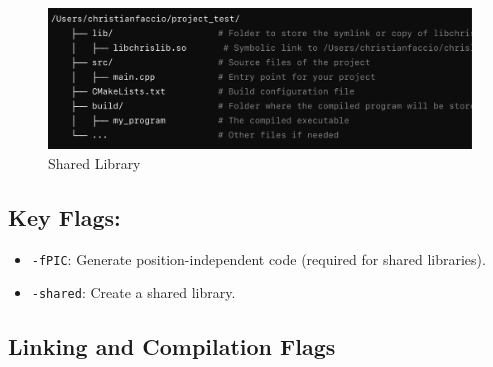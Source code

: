 \begin{figure}
    \centering
    \includegraphics[width=\textwidth]{assets/dynamic_proj_dir.png}
    \caption{Shared Library}
\end{figure}

\subsection*{Key Flags:}
\begin{itemize}
    \item \texttt{-fPIC}: Generate position-independent code (required for shared libraries).
    \item \texttt{-shared}: Create a shared library.
\end{itemize}

\subsection*{Linking and Compilation Flags}


